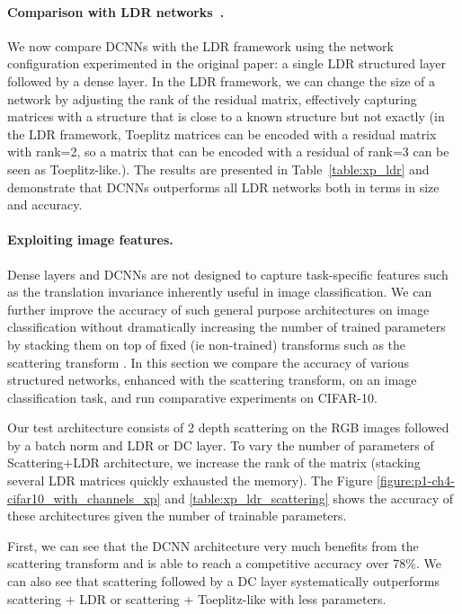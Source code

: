 \paragraph{Comparison with LDR networks~\cite{thomas2018learning}.}
We now compare DCNNs with the LDR framework using the network configuration experimented in the original paper: a single LDR structured layer followed by a dense layer.
In the LDR framework, we can change the size of a network by adjusting the rank of the residual matrix, effectively capturing matrices with a structure that is close to a known structure but not exactly (in the LDR framework, Toeplitz matrices can be encoded with a residual matrix with rank=2, so a matrix that can be encoded with a residual of rank=3 can be seen as Toeplitz-like.).
The results are presented in Table~\ref{table:xp_ldr} and demonstrate that DCNNs outperforms all LDR networks both in terms in size and accuracy.

\paragraph{Exploiting image features.}
Dense layers and DCNNs are not designed to capture task-specific features such as the translation invariance inherently useful in image classification.
We can further improve the accuracy of such general purpose architectures on image classification without dramatically increasing the number of trained parameters by stacking them on top of fixed (ie non-trained) transforms such as the scattering transform \cite{mallat2010recursive}.
In this section we compare the accuracy of various structured networks, enhanced with the scattering transform, on an image classification task, and run comparative experiments on CIFAR-10. 

Our test architecture consists of 2 depth scattering on the RGB images followed by a batch norm and LDR or DC layer.
To vary the number of parameters of Scattering+LDR architecture, we increase the rank of the matrix (stacking several LDR matrices quickly exhausted the memory).
The Figure \ref{figure:p1-ch4-cifar10_with_channels_xp} and \ref{table:xp_ldr_scattering} shows the accuracy of these architectures given the number of trainable parameters.

First, we can see that the DCNN architecture very much benefits from the scattering transform and is able to reach a competitive accuracy over 78\%.
We can also see that scattering followed by a DC layer systematically outperforms scattering + LDR or scattering + Toeplitz-like with less parameters. 


